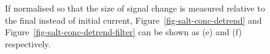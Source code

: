\documentclass[
  a4paper,
]{scrbook}
\begin{document}
\begin{figure}

\begin{minipage}[t]{0.50\linewidth}

{\centering 


}

\subcaption{\label{fig-salt-conc-detrend-2}}
\end{minipage}%
%
\begin{minipage}[t]{0.50\linewidth}

{\centering 


}

\subcaption{\label{fig-salt-conc-detrend-filter-2}}
\end{minipage}%

\caption{\label{fig-salt-conc-sensing-2}If normalised so that the size
of signal change is measured relative to the final instead of initial
current, Figure~\ref{fig-salt-conc-detrend} and
Figure~\ref{fig-salt-conc-detrend-filter} can be shown as (e) and (f)
respectively.}

\end{figure}
\end{document}

